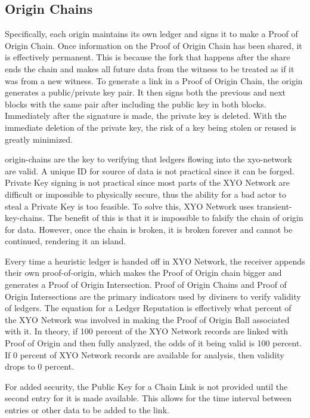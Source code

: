 \documentclass{article}
\begin{document}
\subsection{Origin Chains}

Specifically, each origin maintains its own ledger and signs it to make a Proof of Origin Chain. Once information on the Proof of Origin Chain has been shared, it is effectively permanent. This is because the fork that happens after the share ends the chain and makes all future data from the witness to be treated as if it was from a new witness. To generate a link in a Proof of Origin Chain, the origin generates a public/private key pair. It then signs both the previous and next blocks with the same pair after including the public key in both blocks. Immediately after the signature is made, the private key is deleted. With the immediate deletion of the private key, the risk of a key being stolen or reused is greatly minimized.

\Glspl{origin-chain} are the key to verifying that ledgers flowing into the \Gls{xyo-network} are valid. A unique ID for source of data is not practical since it can be forged. Private Key signing is not practical since most parts of the XYO Network are difficult or impossible to physically secure, thus the ability for a bad actor to steal a Private Key is too feasible. To solve this, XYO Network uses \Glspl{transient-key-chain}. The benefit of this is that it is impossible to falsify the chain of origin for data. However, once the chain is broken, it is broken forever and cannot be continued, rendering it an island.

Every time a \gls{heuristic} ledger is handed off in XYO Network, the receiver appends their own \Gls{proof-of-origin}, which makes the Proof of Origin chain bigger and generates a Proof of Origin Intersection. Proof of Origin Chains and Proof of Origin Intersections are the primary indicators used by \Glspl{diviner} to verify validity of ledgers. The equation for a Ledger Reputation is effectively what percent of the XYO Network was involved in making the Proof of Origin Ball associated with it. In theory, if 100 percent of the XYO Network records are linked with Proof of Origin and then fully analyzed, the odds of it being valid is 100 percent. If 0 percent of XYO Network records are available for analysis, then validity drops to 0 percent.

For added security, the Public Key for a Chain Link is not provided until the second entry for it is made available. This allows for the time interval between entries or other data to be added to the link.
\end{document}
